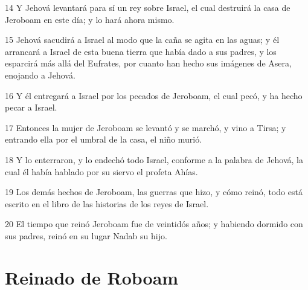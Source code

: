 \par 14 Y Jehová levantará para sí un rey sobre Israel, el cual destruirá la casa de Jeroboam en este día; y lo hará ahora mismo.
\par 15 Jehová sacudirá a Israel al modo que la caña se agita en las aguas; y él arrancará a Israel de esta buena tierra que había dado a sus padres, y los esparcirá más allá del Eufrates, por cuanto han hecho sus imágenes de Asera, enojando a Jehová.
\par 16 Y él entregará a Israel por los pecados de Jeroboam, el cual pecó, y ha hecho pecar a Israel.
\par 17 Entonces la mujer de Jeroboam se levantó y se marchó, y vino a Tirsa; y entrando ella por el umbral de la casa, el niño murió.
\par 18 Y lo enterraron, y lo endechó todo Israel, conforme a la palabra de Jehová, la cual él había hablado por su siervo el profeta Ahías.
\par 19 Los demás hechos de Jeroboam, las guerras que hizo, y cómo reinó, todo está escrito en el libro de las historias de los reyes de Israel.
\par 20 El tiempo que reinó Jeroboam fue de veintidós años; y habiendo dormido con sus padres, reinó en su lugar Nadab su hijo.

\section*{Reinado de Roboam}

